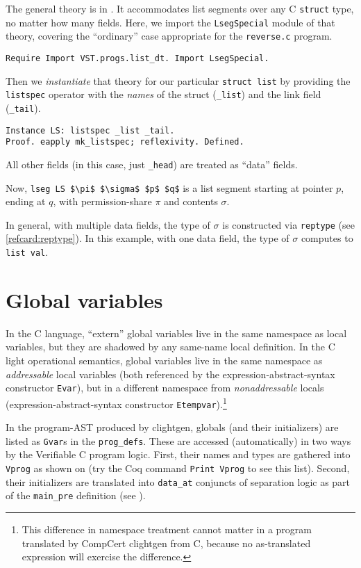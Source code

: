 \documentclass[12pt,fleqn,openany,oneside,showtrims]{memoir}
\begin{document}
The general theory is in .
It accommodates list segments
over any C \lstinline{struct} type, no matter how many fields.
Here, we import
the \lstinline{LsegSpecial} module of that theory,
covering the ``ordinary'' case appropriate for the \lstinline{reverse.c} program.
\begin{lstlisting}
Require Import VST.progs.list_dt. Import LsegSpecial.
\end{lstlisting}

Then we \emph{instantiate} that theory for our particular
\lstinline{struct list} by providing the \lstinline{listspec}
operator with the \emph{names} of the struct (\lstinline{_list})
and the link field (\lstinline{_tail}).
\begin{lstlisting}
Instance LS: listspec _list _tail.
Proof. eapply mk_listspec; reflexivity. Defined.
\end{lstlisting}
All other fields (in this case, just \lstinline{_head}) are
treated as ``data'' fields.

Now, \lstinline{lseg LS $\pi$ $\sigma$ $p$ $q$}
is a list segment starting at pointer $p$,
ending at $q$, with permission-share $\pi$ and contents $\sigma$.

In general, with multiple data fields, the type of $\sigma$
is constructed via \lstinline{reptype} (see \autoref{refcard:reptype}).
In this example, with one data field,
the type of $\sigma$ computes to \lstinline{list val}.

\chapter{Global variables}
\label{refcard:global-vars}

In the C language, ``extern'' global variables
live in the same namespace as local variables, but they
are shadowed by any same-name local definition.
In the C light operational semantics, global variables
live in the same namespace as \emph{addressable} local variables
(both referenced by the expression-abstract-syntax
constructor \lstinline{Evar}),
but in a different namespace from \emph{nonaddressable} locals
(expression-abstract-syntax
constructor \lstinline{Etempvar}).\footnote{This difference in namespace
treatment cannot matter in a program translated by CompCert clightgen from C,
because no as-translated expression will exercise the difference.}

In the program-AST produced by clightgen, globals (and their initializers)
are listed as \lstinline{Gvar}s in the \lstinline{prog_defs}.
These are accessed (automatically) in two ways by the Verifiable C
program logic.  First, their names and types are gathered into
\lstinline{Vprog} as shown on 
(try the Coq command \lstinline{Print Vprog} to see this list).
Second, their initializers are translated into
\lstinline{data_at} conjuncts of separation logic
as part of the \lstinline{main_pre} definition
(see ).
\end{document}
